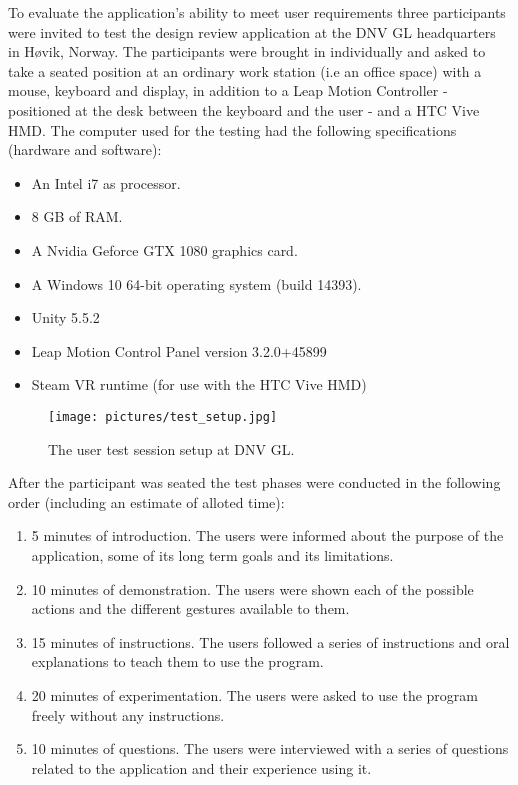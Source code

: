 
To evaluate the application's ability to meet user requirements three participants were invited to test the design review application at the DNV GL headquarters in Høvik, Norway.
The participants were brought in individually and asked to take a seated position at an ordinary work station (i.e an office space) with a mouse, keyboard and display, 
in addition to a Leap Motion Controller - positioned at the desk between the keyboard and the user - and a HTC Vive HMD. 
The computer used for the testing had the following specifications (hardware and software):

\begin{itemize}
    \item An Intel i7 as processor.
    \item 8 GB of RAM.
    \item A Nvidia Geforce GTX 1080 graphics card.
    \item A Windows 10 64-bit operating system (build 14393).
    \item Unity 5.5.2
    \item Leap Motion Control Panel version 3.2.0+45899
    \item Steam VR runtime (for use with the HTC Vive HMD)
\end{itemize}

\begin{figure}%
	\texttt{[image: pictures/test\_setup.jpg]}
	\caption[The user test session setup.]{The user test session setup at DNV GL. }
	\label{fig:test_setup}
\end{figure} 

After the participant was seated the test phases were conducted in the following order (including an estimate of alloted time):

\begin{enumerate}
    \item  5 minutes of introduction. The users were informed about the purpose of the application, some of its long term goals and its limitations.
    \item 10 minutes of demonstration. The users were shown each of the possible actions and the different gestures available to them.
    \item 15 minutes of instructions. The users followed a series of instructions and oral explanations to teach them to use the program.
    \item 20 minutes of experimentation. The users were asked to use the program freely without any instructions.  
    \item 10 minutes of questions. The users were interviewed with a series of questions related to the application and their experience using it.   
\end{enumerate}

